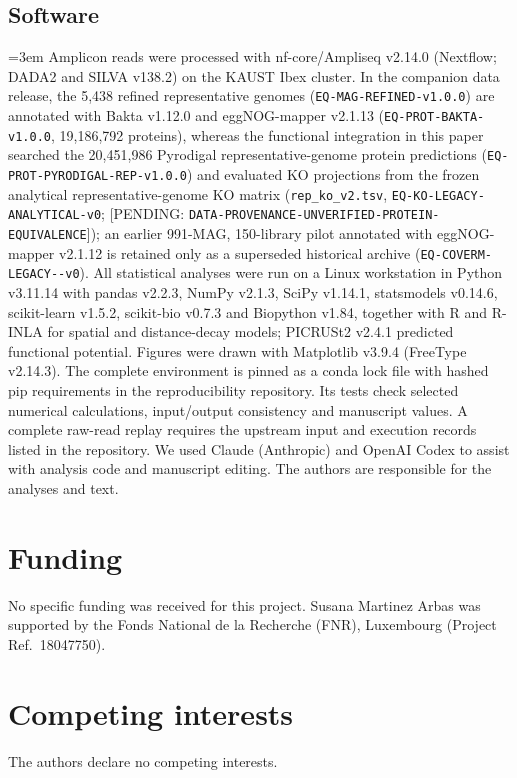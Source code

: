 \documentclass[fleqn,10pt,numbers]{olplainarticle}
\begin{document}
\subsection*{Software}
{\emergencystretch=3em
Amplicon reads were processed with nf-core/Ampliseq v2.14.0 (Nextflow; DADA2
and SILVA v138.2) on the KAUST Ibex cluster. In the companion data release, the 5,438 refined representative
genomes (\texttt{EQ-\allowbreak MAG-\allowbreak REFINED-\allowbreak v1.0.0}) are annotated with Bakta v1.12.0 and
eggNOG-mapper v2.1.13 (\texttt{EQ-\allowbreak PROT-\allowbreak BAKTA-\allowbreak v1.0.0}, 19,186,792 proteins),
whereas the functional integration in this paper searched the 20,451,986 Pyrodigal
representative-genome protein predictions (\texttt{EQ-\allowbreak PROT-\allowbreak PYRODIGAL-\allowbreak REP-\allowbreak v1.0.0}) and evaluated KO projections from the frozen analytical representative-genome KO matrix (\texttt{rep\_\allowbreak ko\_\allowbreak v2.tsv}, \texttt{EQ-\allowbreak KO-\allowbreak LEGACY-\allowbreak ANALYTICAL-\allowbreak v0}; [PENDING: \texttt{DATA-\allowbreak PROVENANCE-\allowbreak UNVERIFIED-\allowbreak PROTEIN-\allowbreak EQUIVALENCE}]);
an earlier 991-MAG, 150-library pilot annotated with eggNOG-mapper v2.1.12 is
retained only as a superseded historical archive (\texttt{EQ-\allowbreak COVERM-\allowbreak LEGACY--\allowbreak v0}).
All statistical analyses
were run on a Linux workstation in Python v3.11.14 with pandas v2.2.3, NumPy
v2.1.3, SciPy v1.14.1, statsmodels v0.14.6, scikit-learn v1.5.2, scikit-bio
v0.7.3 and Biopython v1.84, together with R and R-INLA for spatial and
distance-decay models; PICRUSt2 v2.4.1 predicted functional potential.
Figures were drawn with Matplotlib v3.9.4 (FreeType v2.14.3). The complete
environment is pinned as a conda lock file with hashed pip requirements in the
reproducibility repository. Its tests check selected numerical calculations,
input/output consistency and manuscript values. A complete raw-read replay
requires the upstream input and execution records listed in the repository.
We used Claude (Anthropic) and OpenAI Codex to assist with analysis code and
manuscript editing. The authors are responsible for the analyses and text.
\par}

\section*{Funding}
No specific funding was received for this project.
Susana Martinez Arbas was supported by the Fonds National de la Recherche (FNR), Luxembourg
(Project Ref.\ 18047750).

\section*{Competing interests}
The authors declare no competing interests.


\end{document}
